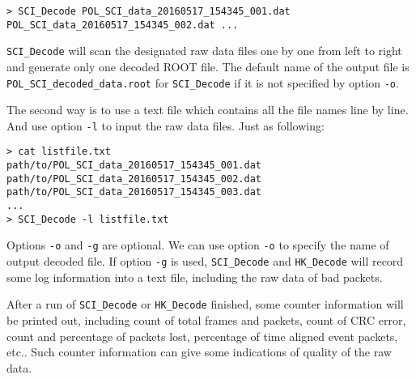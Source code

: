 \documentclass[a4paper, 12pt, onecolumn]{article}
\begin{document}
\begin{Verbatim}[fontsize=\scriptsize, frame=single]
> SCI_Decode POL_SCI_data_20160517_154345_001.dat POL_SCI_data_20160517_154345_002.dat ...
\end{Verbatim}

\texttt{SCI\_Decode} will scan the designated raw data files one by one from left to right and generate only one decoded ROOT file.
The default name of the output file is \texttt{POL\_SCI\_decoded\_data.root} for \texttt{SCI\_Decode} if it is not specified by option \texttt{-o}.

The second way is to use a text file which contains all the file names line by line. And use option \texttt{-l} to input the raw data files. Just as following:

\begin{Verbatim}[fontsize=\scriptsize, frame=single]
> cat listfile.txt
path/to/POL_SCI_data_20160517_154345_001.dat
path/to/POL_SCI_data_20160517_154345_002.dat
path/to/POL_SCI_data_20160517_154345_003.dat
...
> SCI_Decode -l listfile.txt
\end{Verbatim}

Options \texttt{-o} and \texttt{-g} are optional. We can use option \texttt{-o} to specify the name of output decoded file.
If option \texttt{-g} is used, \texttt{SCI\_Decode} and \texttt{HK\_Decode} will record some log information into a text file,
including the raw data of bad packets.

After a run of \texttt{SCI\_Decode} or \texttt{HK\_Decode} finished, some counter information will be printed out,
including count of total frames and packets, count of CRC error, count and percentage of packets lost, percentage of time aligned event packets, etc..
Such counter information can give some indications of quality of the raw data.
\end{document}

